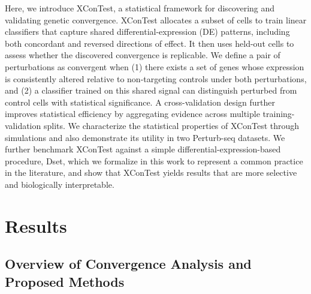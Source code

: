 \documentclass[11pt]{article}
\begin{document}
Here, we introduce XConTest, a statistical framework for discovering and validating genetic convergence. XConTest allocates a subset of cells to train linear classifiers that capture shared differential-expression (DE) patterns, including both concordant and reversed directions of effect. It then uses held-out cells to assess whether the discovered convergence is replicable. We define a pair of perturbations as convergent when (1) there exists a set of genes whose expression is consistently altered relative to non-targeting controls under both perturbations, and (2) a classifier trained on this shared signal can distinguish perturbed from control cells with statistical significance. A cross-validation design further improves statistical efficiency by aggregating evidence across multiple training-validation splits. We characterize the statistical properties of XConTest through simulations and also demonstrate its utility in two Perturb-seq datasets. We further benchmark XConTest against a simple differential-expression-based procedure, Dset, which we formalize in this work to represent a common practice in the literature, and show that XConTest yields results that are more selective and biologically interpretable.


\section*{Results}

\subsection*{Overview of Convergence Analysis and Proposed Methods}
\end{document}
